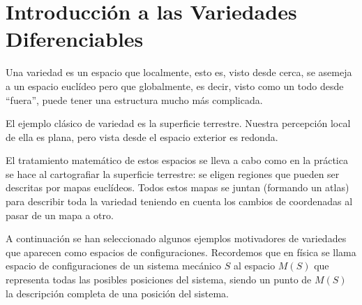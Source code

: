 \documentclass[../VD.tex]{subfiles}
\begin{document}
\setcounter{chapter}{-1}

\chapter[Introducción]{Introducción a las Variedades Diferenciables}
\label{chap:intro}

Una variedad es un espacio que localmente, esto es, visto desde cerca, se
asemeja a un espacio euclídeo pero que globalmente, es decir, visto como un todo
desde ``fuera'', puede tener una estructura mucho más complicada.

El ejemplo clásico de variedad es la superficie terrestre. Nuestra percepción
local de ella es plana, pero vista desde el espacio exterior es redonda.

El tratamiento matemático de estos espacios se lleva a cabo como en la práctica
se hace al cartografiar la superficie terrestre: se eligen regiones que pueden
ser descritas por mapas euclídeos. Todos estos mapas se juntan (formando un
atlas) para describir toda la variedad teniendo en cuenta los cambios de
coordenadas al pasar de un mapa a otro.

A continuación se han seleccionado algunos ejemplos motivadores de variedades
que aparecen como espacios de configuraciones. Recordemos que en física se llama
espacio de configuraciones de un sistema mecánico $S$ al espacio $M(S)$ que
representa todas las posibles posiciones del sistema, siendo un punto de $M(S)$
la descripción completa de una posición del sistema.
\end{document}
